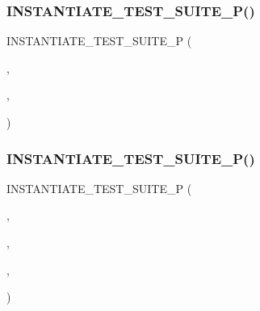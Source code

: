 \subsubsection{\texorpdfstring{INSTANTIATE\_TEST\_SUITE\_P()}{INSTANTIATE\_TEST\_SUITE\_P()}\hspace{0.1cm}{\footnotesize\ttfamily [1/2]}}
{\footnotesize\ttfamily I\+N\+S\+T\+A\+N\+T\+I\+A\+T\+E\+\_\+\+T\+E\+S\+T\+\_\+\+S\+U\+I\+T\+E\+\_\+P (\begin{DoxyParamCaption}\item[{Printing\+Failing\+Params}]{,  }\item[{\mbox{\hyperlink{class_failing_param_test}{Failing\+Param\+Test}}}]{,  }\item[{\mbox{\hyperlink{namespacetesting_abd3c87b40c2a0663691c9b617ed5fcc2}{testing\+::\+Values}}(2)}]{ }\end{DoxyParamCaption})}

\mbox{\label{_obj__test_2lib_2googletest-master_2googletest_2test_2googletest-output-test___8cc_a5c488fe4474fec68c24acfc4fb353ed7}} 
\subsubsection{\texorpdfstring{INSTANTIATE\_TEST\_SUITE\_P()}{INSTANTIATE\_TEST\_SUITE\_P()}\hspace{0.1cm}{\footnotesize\ttfamily [2/2]}}
{\footnotesize\ttfamily I\+N\+S\+T\+A\+N\+T\+I\+A\+T\+E\+\_\+\+T\+E\+S\+T\+\_\+\+S\+U\+I\+T\+E\+\_\+P (\begin{DoxyParamCaption}\item[{Printing\+Strings}]{,  }\item[{\mbox{\hyperlink{class_param_test}{Param\+Test}}}]{,  }\item[{\mbox{\hyperlink{namespacetesting_abd3c87b40c2a0663691c9b617ed5fcc2}{testing\+::\+Values}}(std\+::string(\char`\"{}a\char`\"{}))}]{,  }\item[{\mbox{\hyperlink{_obj__test_2lib_2googletest-release-1_88_81_2googletest_2test_2googletest-output-test___8cc_a61c686cb1c0f8f19c100ff975482ec7a}{Param\+Name\+Func}}}]{ }\end{DoxyParamCaption})}

